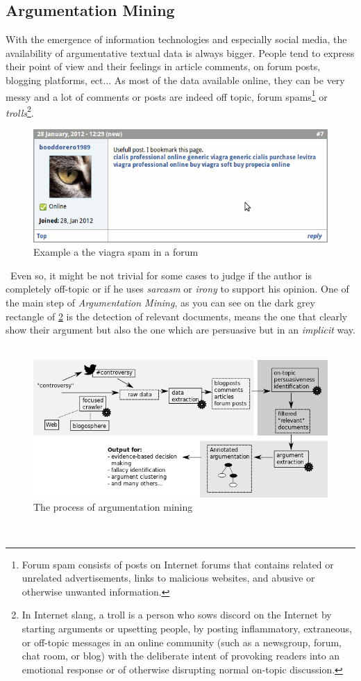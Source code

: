 \subsection{Argumentation Mining}
With the emergence of information technologies and especially social media, the availability of argumentative textual data is always bigger. People tend to express their point of view and their feelings in article comments, on forum posts, blogging platforms, ect... As most of the data available online, they can be very messy and a lot of comments or posts are indeed off topic, forum spams\footnote{Forum spam consists of posts on Internet forums that contains related or unrelated advertisements, links to malicious websites, and abusive or otherwise unwanted information.} or \emph{trolls}\footnote{In Internet slang, a troll is a person who sows discord on the Internet by starting arguments or upsetting people, by posting inflammatory, extraneous, or off-topic messages in an online community (such as a newsgroup, forum, chat room, or blog) with the deliberate intent of provoking readers into an emotional response or of otherwise disrupting normal on-topic discussion.}. 
\
\begin{figure}[H]
    \centering
    \includegraphics[width=1\textwidth]{fig/spam.png}
    \caption[Short caption]{Example a the viagra spam in a forum}
    \label{fig:forumspam}
\end{figure}
\
Even so, it might be not trivial for some cases to judge if the author is completely off-topic or if he uses \emph{\gls{sarcasm}} or \emph{\gls{irony}} to support his opinion. One of the main step of \emph{Argumentation Mining}, as you can see on the dark grey rectangle of \ref{fig:argmining} is the detection of relevant documents, means the one that clearly show their argument but also the one which are persuasive but in an \emph{implicit} way.
\
\begin{figure}[H]
    \centering
    \includegraphics[width=1\textwidth]{fig/overview.png}
    \caption[Short caption]{The process of argumentation mining}
    \label{fig:argmining}
\end{figure}
\

